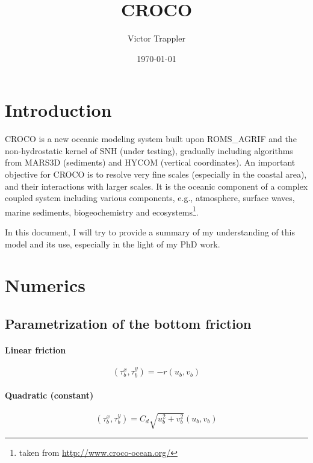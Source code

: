 \message{ !name(croco.tex)}\documentclass{article}
\author{Victor Trappler}
\title{CROCO}
\date{\today}
\begin{document}

\maketitle

\section*{Introduction}

CROCO is a new oceanic modeling system built upon ROMS\_AGRIF and the non-hydrostatic kernel of SNH (under testing), gradually including algorithms from MARS3D (sediments)  and HYCOM (vertical coordinates). An important objective for CROCO is to resolve very fine scales (especially in the coastal area), and their interactions with larger scales. It is the oceanic component of a complex coupled system including various components, e.g., atmosphere, surface waves, marine sediments, biogeochemistry and ecosystems\footnote{taken from \url{http://www.croco-ocean.org/}}.

In this document, I will try to provide a summary of my understanding of this model and its use, especially in the light of my PhD work.
\section{Numerics}
\subsection{Parametrization of the bottom friction}
\paragraph{Linear friction}
\begin{equation}
  \label{eq:linear_friction}
  (\tau_b^x, \tau_b^y) = -r (u_b, v_b)
\end{equation}
\paragraph{Quadratic (constant)}
\begin{equation}
  \label{eq:quadratic_friction_constant}
  (\tau_b^x, \tau_b^y) = C_d \sqrt{u_b^2 + v_b^2}(u_b, v_b)
\end{equation}
\end{document}

